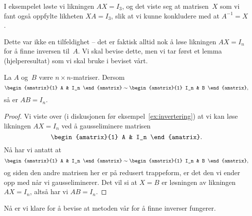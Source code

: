 I eksempelet løste vi likningen $AX = I_3$, og det viste seg at
matrisen~$X$ som vi fant også oppfylte likheten $XA = I_3$, slik at vi
kunne konkludere med at $A^{-1} = X$.

Dette var ikke en tilfeldighet -- det er faktisk alltid nok å løse
likningen $AX = I_n$ for å finne inversen til~$A$.  Vi skal bevise
dette, men vi tar først et lemma (hjelperesultat) som vi skal bruke i
beviset vårt.

\begin{lem}
\label{lem:invers}
La $A$ og~$B$ være $n \times n$-matriser.  Dersom
\[
\begin{amatrix}{1} A & I_n \end{amatrix}
\roweq
\begin{amatrix}{1} I_n & B \end{amatrix},
\]
så er $AB = I_n$.
\end{lem}
\begin{proof}
Vi viste over (i diskusjonen før eksempel~\ref{ex:invertering}) at vi kan
løse likningen $AX = I_n$ ved å gausseliminere matrisen
\[
\begin{amatrix}{1} A & I_n \end{amatrix}.
\]
Nå har vi antatt at
\[
\begin{amatrix}{1} A & I_n \end{amatrix}
\roweq
\begin{amatrix}{1} I_n & B \end{amatrix},
\]
og siden den andre matrisen her er på redusert trappeform, er det den
vi ender opp med når vi gausseliminerer.  Det vil si at $X = B$ er
løsningen av likningen $AX = I_n$, altså har vi $AB = I_n$.
\end{proof}

Nå er vi klare for å bevise at metoden vår for å finne inverser
fungerer.

